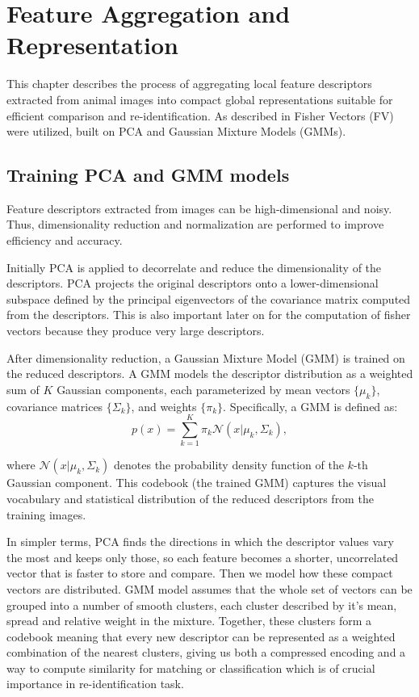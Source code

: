 \chapter{Feature Aggregation and Representation}
\label{chap:feature_aggregation}
This chapter describes the process of aggregating local feature descriptors extracted from animal images into compact global representations suitable for efficient comparison and re-identification. As described in \cite{springerSpeciesAgnosticPatterned} Fisher Vectors (FV) were utilized, built on PCA and Gaussian Mixture Models (GMMs).

\section{Training PCA and GMM models}
\label{sec:pca_gmm_training}

Feature descriptors extracted from images can be high-dimensional and noisy. Thus, dimensionality reduction and normalization are performed to improve efficiency and accuracy.

Initially PCA is applied to decorrelate and reduce the dimensionality of the descriptors. PCA projects the original descriptors onto a lower-dimensional subspace defined by the principal eigenvectors of the covariance matrix computed from the descriptors. This is also important later on for the computation of fisher vectors because they produce very large descriptors.\cite{springerSpeciesAgnosticPatterned}

After dimensionality reduction, a Gaussian Mixture Model (GMM) is trained on the reduced descriptors. A GMM models the descriptor distribution as a weighted sum of $K$ Gaussian components, each parameterized by mean vectors $\{\mu_k\}$, covariance matrices $\{\Sigma_k\}$, and weights $\{\pi_k\}$. Specifically, a GMM is defined as:
\begin{equation}
    p(x) = \sum_{k=1}^{K}\pi_k \mathcal{N}(x|\mu_k,\Sigma_k),
\end{equation}

where $\mathcal{N}(x|\mu_k,\Sigma_k)$ denotes the probability density function of the $k$-th Gaussian component. This codebook (the trained GMM) captures the visual vocabulary and statistical distribution of the reduced descriptors from the training images.\cite{springerSpeciesAgnosticPatterned}

In simpler terms, PCA finds the directions in which the descriptor values vary the most and keeps only those, so each feature becomes a shorter, uncorrelated vector that is faster to store and compare. Then we model how these compact vectors are distributed. GMM model assumes that the whole set of vectors can be grouped into a number of smooth clusters, each cluster described by it's mean, spread and relative weight in the mixture. Together, these clusters form a codebook meaning that every new descriptor can be represented as a weighted combination of the nearest clusters, giving us both a compressed encoding and a way to compute similarity for matching or classification which is of crucial importance in re-identification task. 

